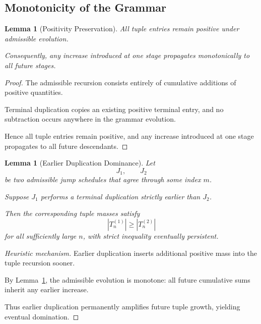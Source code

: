 \documentclass[12pt, oneside]{article}
\numberwithin{equation}{section}
\theoremstyle{definition}
\theoremstyle{plain}
\newtheorem{lemma}[theorem]{Lemma}
\theoremstyle{remark}
\begin{document}

\subsection{Monotonicity of the Grammar}


\begin{lemma}[Positivity Preservation]
\label{lem:positivity}
All tuple entries remain positive under admissible evolution.

Consequently, any increase introduced at one stage propagates
monotonically to all future stages.
\end{lemma}

\begin{proof}
The admissible recursion consists entirely of cumulative additions
of positive quantities.

Terminal duplication copies an existing positive terminal entry,
and no subtraction occurs anywhere in the grammar evolution.

Hence all tuple entries remain positive, and any increase introduced
at one stage propagates to all future descendants.
\end{proof}


\begin{lemma}[Earlier Duplication Dominance]
\label{lem:earlier-duplication}
Let
\[
J_1,\qquad J_2
\]
be two admissible jump schedules that agree through some index $m$.

Suppose $J_1$ performs a terminal duplication strictly earlier than
$J_2$.

Then the corresponding tuple masses satisfy
\[
|T_n^{(1)}|
\ge
|T_n^{(2)}|
\]
for all sufficiently large $n$, with strict inequality eventually
persistent.
\end{lemma}

\begin{proof}[Heuristic mechanism]
Earlier duplication inserts additional positive mass into the tuple
recursion sooner.

By Lemma~\ref{lem:positivity}, the admissible evolution is monotone:
all future cumulative sums inherit any earlier increase.

Thus earlier duplication permanently amplifies future tuple growth,
yielding eventual domination.
\end{proof}
\end{document}
